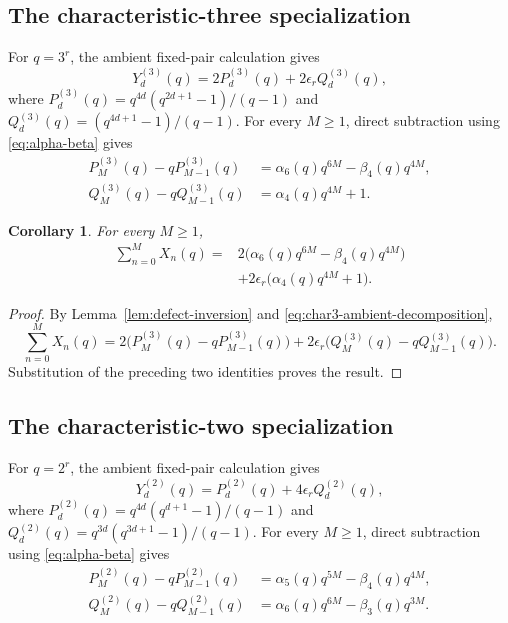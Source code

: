 \documentclass[a4paper,12pt]{amsart}
\newtheorem{cor}[thm]{Corollary}
\theoremstyle{definition}
\begin{document}
\subsection{The characteristic-three specialization}

For $q=3^r$, the ambient fixed-pair calculation gives
\begin{equation}\label{eq:char3-ambient-decomposition}
Y_d^{(3)}(q)=2P_d^{(3)}(q)+2\epsilon_rQ_d^{(3)}(q),
\end{equation}
where $P_d^{(3)}(q)=q^{4d}(q^{2d+1}-1)/(q-1)$ and $Q_d^{(3)}(q)=(q^{4d+1}-1)/(q-1)$.  For every $M\geq1$, direct subtraction using \eqref{eq:alpha-beta} gives
\begin{align*}
P_M^{(3)}(q)-qP_{M-1}^{(3)}(q)
&=
\alpha_6(q)q^{6M}-\beta_4(q)q^{4M},\\
Q_M^{(3)}(q)-qQ_{M-1}^{(3)}(q)
&=
\alpha_4(q)q^{4M}+1.
\end{align*}

\begin{cor}
\label{cor:char3-extra-inertia-sum}
For every $M\geq1$,
\begin{align}
\sum_{n=0}^{M}X_n(q)
={}&
2\bigl(\alpha_6(q)q^{6M}-\beta_4(q)q^{4M}\bigr)
\nonumber\\
&+2\epsilon_r\bigl(\alpha_4(q)q^{4M}+1\bigr).
\label{eq:char3-extra-inertia-sum}
\end{align}
\end{cor}

\begin{proof}
By Lemma~\ref{lem:defect-inversion} and \eqref{eq:char3-ambient-decomposition},
\[
\sum_{n=0}^{M}X_n(q)
=
2\bigl(P_M^{(3)}(q)-qP_{M-1}^{(3)}(q)\bigr)
+
2\epsilon_r\bigl(Q_M^{(3)}(q)-qQ_{M-1}^{(3)}(q)\bigr).
\]
Substitution of the preceding two identities proves the result.
\end{proof}

\subsection{The characteristic-two specialization}

For $q=2^r$, the ambient fixed-pair calculation gives
\begin{equation}\label{eq:char2-ambient-decomposition}
Y_d^{(2)}(q)=P_d^{(2)}(q)+4\epsilon_rQ_d^{(2)}(q),
\end{equation}
where $P_d^{(2)}(q)=q^{4d}(q^{d+1}-1)/(q-1)$ and $Q_d^{(2)}(q)=q^{3d}(q^{3d+1}-1)/(q-1)$.  For every $M\geq1$, direct subtraction using \eqref{eq:alpha-beta} gives
\begin{align*}
P_M^{(2)}(q)-qP_{M-1}^{(2)}(q)
&=
\alpha_5(q)q^{5M}-\beta_4(q)q^{4M},\\
Q_M^{(2)}(q)-qQ_{M-1}^{(2)}(q)
&=
\alpha_6(q)q^{6M}-\beta_3(q)q^{3M}.
\end{align*}
\end{document}
